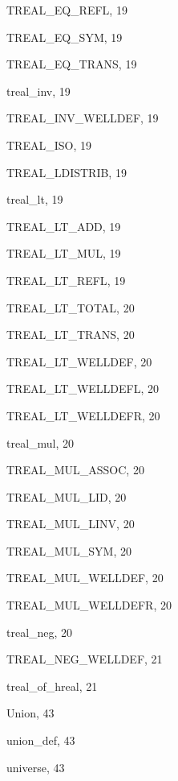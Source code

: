 \begin{theindex}
  \item {\ptt TREAL\_EQ\_REFL}, 19
  \item {\ptt TREAL\_EQ\_SYM}, 19
  \item {\ptt TREAL\_EQ\_TRANS}, 19
  \item {\ptt treal\_inv}, 19
  \item {\ptt TREAL\_INV\_WELLDEF}, 19
  \item {\ptt TREAL\_ISO}, 19
  \item {\ptt TREAL\_LDISTRIB}, 19
  \item {\ptt treal\_lt}, 19
  \item {\ptt TREAL\_LT\_ADD}, 19
  \item {\ptt TREAL\_LT\_MUL}, 19
  \item {\ptt TREAL\_LT\_REFL}, 19
  \item {\ptt TREAL\_LT\_TOTAL}, 20
  \item {\ptt TREAL\_LT\_TRANS}, 20
  \item {\ptt TREAL\_LT\_WELLDEF}, 20
  \item {\ptt TREAL\_LT\_WELLDEFL}, 20
  \item {\ptt TREAL\_LT\_WELLDEFR}, 20
  \item {\ptt treal\_mul}, 20
  \item {\ptt TREAL\_MUL\_ASSOC}, 20
  \item {\ptt TREAL\_MUL\_LID}, 20
  \item {\ptt TREAL\_MUL\_LINV}, 20
  \item {\ptt TREAL\_MUL\_SYM}, 20
  \item {\ptt TREAL\_MUL\_WELLDEF}, 20
  \item {\ptt TREAL\_MUL\_WELLDEFR}, 20
  \item {\ptt treal\_neg}, 20
  \item {\ptt TREAL\_NEG\_WELLDEF}, 21
  \item {\ptt treal\_of\_hreal}, 21

  \indexspace

  \item {\ptt Union}, 43
  \item {\ptt union\_def}, 43
  \item {\ptt universe}, 43

\end{theindex}
